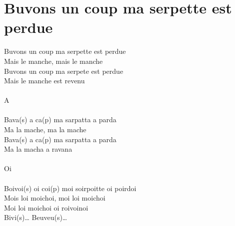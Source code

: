 \section*{Buvons un coup ma serpette est perdue}
Buvons un coup ma serpette est perdue\\
Mais le manche, mais le manche\\
Buvons un coup ma serpete est perdue\\
Mais le manche est revenu\\\\
A\\\\
Bava(s) a ca(p) ma sarpatta a parda\\
Ma la mache, ma la mache\\
Bava(s) a ca(p) ma sarpatta a parda\\
Ma la macha a ravana\\\\
Oi\\\\
Boivoi(s) oi coi(p) moi soirpoitte oi poirdoi\\
Mois loi moichoi, moi loi moichoi\\
Moi loi moichoi oi roivoinoi\\
Bivi(s)… Beuveu(s)…